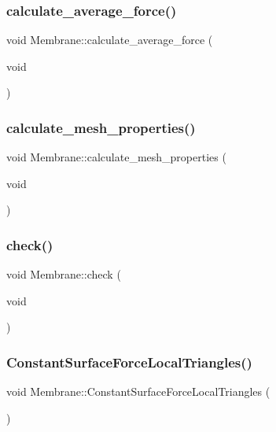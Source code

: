 \subsubsection{\texorpdfstring{calculate\_average\_force()}{calculate\_average\_force()}}
{\footnotesize\ttfamily void Membrane\+::calculate\+\_\+average\+\_\+force (\begin{DoxyParamCaption}\item[{void}]{ }\end{DoxyParamCaption})\hspace{0.3cm}{\ttfamily [inline]}}

\mbox{\label{classMembrane_adb71eee849f346efcd7303241a3469c2}} 
\subsubsection{\texorpdfstring{calculate\_mesh\_properties()}{calculate\_mesh\_properties()}}
{\footnotesize\ttfamily void Membrane\+::calculate\+\_\+mesh\+\_\+properties (\begin{DoxyParamCaption}\item[{void}]{ }\end{DoxyParamCaption})}

\mbox{\label{classMembrane_ae67772a7835b7d550d8e832ae99842fa}} 
\subsubsection{\texorpdfstring{check()}{check()}}
{\footnotesize\ttfamily void Membrane\+::check (\begin{DoxyParamCaption}\item[{void}]{ }\end{DoxyParamCaption})}

\mbox{\label{classMembrane_afeb736c81896f74f23e44ceaaa0d1e04}} 
\subsubsection{\texorpdfstring{ConstantSurfaceForceLocalTriangles()}{ConstantSurfaceForceLocalTriangles()}}
{\footnotesize\ttfamily void Membrane\+::\+Constant\+Surface\+Force\+Local\+Triangles (\begin{DoxyParamCaption}{ }\end{DoxyParamCaption})}

